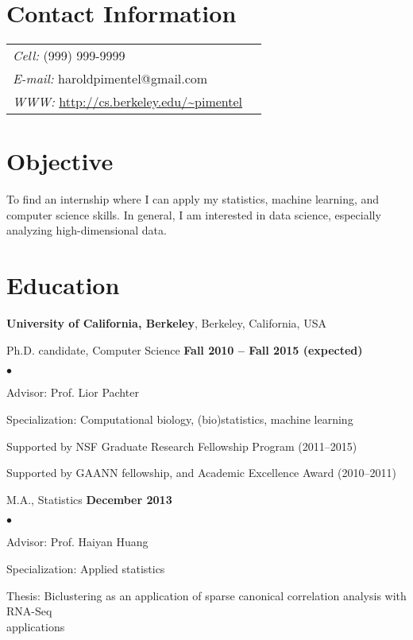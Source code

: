 \documentclass[margin,line]{res}
\newenvironment{list2}{
  \begin{list}{$\bullet$}{%
      \setlength{\itemsep}{0in}
      \setlength{\parsep}{0in} \setlength{\parskip}{0in}
      \setlength{\topsep}{0in} \setlength{\partopsep}{0in}
      \setlength{\leftmargin}{0.2in}}}{\end{list}}
\begin{document}

\begin{resume}
\section{\sc Contact Information}
\vspace{.05in}
\begin{tabular}{@{}p{4in}p{2in}}
 {\it Cell:}  (999) 999-9999 & \\
 {\it E-mail:}  haroldpimentel@gmail.com & \\
 {\it WWW:} \url{http://cs.berkeley.edu/~pimentel} &
\end{tabular}

\section{\sc Objective}
To find an internship where I can apply my statistics, machine learning, and
computer science skills. In general, I am interested in data science, especially
analyzing high-dimensional data.

\section{\sc Education}
{\bf University of California, Berkeley}, Berkeley, California, USA

\vspace{-.3cm}
Ph.D. candidate, Computer Science \hfill {\bf
  Fall 2010 -- Fall 2015 (expected) }\\
\vspace{-.45cm}
\begin{list2}
  \vspace*{1mm}
\item Advisor: Prof. Lior Pachter
\item Specialization: Computational biology, (bio)statistics, machine learning
\item Supported by NSF Graduate Research Fellowship Program (2011--2015)
\item Supported by GAANN fellowship, and Academic Excellence Award (2010--2011)
\end{list2}

M.A., Statistics \hfill {\bf
 December 2013}\\
\vspace{-.45cm}
\begin{list2}
\vspace*{1mm}
\item Advisor: Prof. Haiyan Huang
\item Specialization: Applied statistics
\item Thesis: Biclustering as an application of sparse canonical correlation analysis with RNA-Seq \\applications
\end{list2}


\end{resume}
\end{document}

